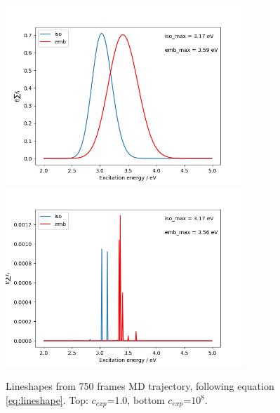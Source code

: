\documentclass[twoside, 12pt]{article}
\begin{document}
\begin{figure}[H]
\centering
\includegraphics[width=9cm]{./figures/both_lineshape_broad.png}\includegraphics[width=9cm]{./figures/both_lineshape_sharp.png}
\caption{Lineshapes from 750 frames MD trajectory, following equation \ref{eq:lineshape}. Top: $c_{exp}$=1.0, bottom $c_{exp}$=$10^{8}$. } 
\label{fig:lineshape}
\end{figure}
\end{document}
